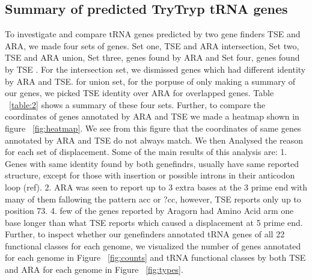 \documentclass[
10pt, %
a4paper, %
oneside, %
headinclude,footinclude, %
BCOR5mm, %
]{scrartcl}
\begin{document}
\subsection{Summary of predicted TryTryp tRNA genes}
To investigate and compare tRNA genes predicted by two gene finders TSE and ARA, we made four sets of genes. Set one, TSE and ARA intersection, Set two, TSE and ARA union, Set three, genes found by ARA and Set four, genes found by TSE . For the intersection set, we dismissed genes which had different identity by ARA and TSE. for union set, for the porpuse of only making a summary of our genes, we picked TSE identity over ARA for overlapped genes. Table  ~\ref{table:2} shows a summary of these four sets. Further, to compare the coordinates of genes annotated by ARA and TSE we made a heatmap shown in figure ~\ref{fig:heatmap}. We see from this figure that the coordinates of same genes annotated by ARA and TSE do not always match. We then Analysed the reason for each set of displacement. Some of the main results of this analysis are:
1. Genes with same identity found by both genefindrs, usually have same reported structure, except for those with insertion or possible introns in their anticodon loop (ref). 2. ARA was seen to report up to 3 extra bases at the 3 prime end with many of them fallowing the pattern acc or ?cc, however, TSE reports only up to position 73. 4. few of the genes reported by Aragorn had Amino Acid arm one base longer than what TSE reports which caused a displacement at 5 prime end.
Further, to inspect whether our genefinders annotated tRNA genes of all 22 functional classes for each genome, we visualized the number of genes annotated for each genome in Figure ~\ref{fig:counts} and tRNA functional classes 	 by both TSE and ARA for each genome in Figure ~\ref{fig:types}.
\end{document}
